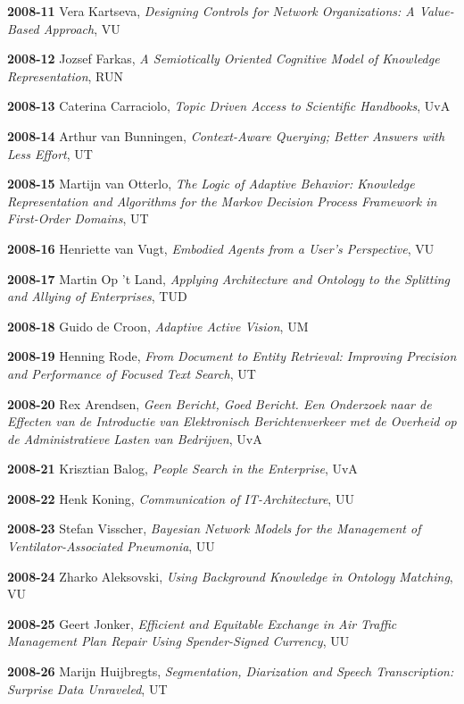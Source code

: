 \begin{multicols}{2}
\textbf{2008-11}   Vera Kartseva, \textit{Designing Controls for Network Organizations: A Value-Based Approach}, VU

\textbf{2008-12}   Jozsef Farkas, \textit{A Semiotically Oriented Cognitive Model of Knowledge Representation}, RUN

\textbf{2008-13}   Caterina Carraciolo, \textit{Topic Driven Access to Scientific Handbooks}, UvA

\textbf{2008-14}   Arthur van Bunningen, \textit{Context-Aware Querying; Better Answers with Less Effort}, UT

\textbf{2008-15}   Martijn van Otterlo, \textit{The Logic of Adaptive Behavior: Knowledge Representation and Algorithms for the Markov Decision Process Framework in First-Order Domains}, UT

\textbf{2008-16}   Henriette van Vugt, \textit{Embodied Agents from a User's Perspective}, VU
 
\textbf{2008-17}   Martin Op 't Land, \textit{Applying Architecture and Ontology to the Splitting and Allying of Enterprises}, TUD

\textbf{2008-18}   Guido de Croon, \textit{Adaptive Active Vision}, UM

\textbf{2008-19}   Henning Rode, \textit{ From Document to Entity Retrieval: Improving Precision and Performance of Focused Text Search}, UT

\textbf{2008-20}   Rex Arendsen, \textit{Geen Bericht, Goed Bericht. Een Onderzoek naar de Effecten van de Introductie van Elektronisch Berichtenverkeer met de Overheid op de Administratieve Lasten van Bedrijven}, UvA

\textbf{2008-21}   Krisztian Balog, \textit{People Search in the Enterprise}, UvA

\textbf{2008-22}   Henk Koning, \textit{Communication of IT-Architecture}, UU

\textbf{2008-23}   Stefan Visscher, \textit{Bayesian Network Models for the Management of Ventilator-Associated Pneumonia}, UU

\textbf{2008-24}   Zharko Aleksovski, \textit{Using Background Knowledge in Ontology Matching}, VU

\textbf{2008-25}   Geert Jonker, \textit{Efficient and Equitable Exchange in Air Traffic Management Plan Repair Using Spender-Signed Currency}, UU

\textbf{2008-26}   Marijn Huijbregts, \textit{Segmentation, Diarization and Speech Transcription: Surprise Data Unraveled}, UT


\end{multicols}
